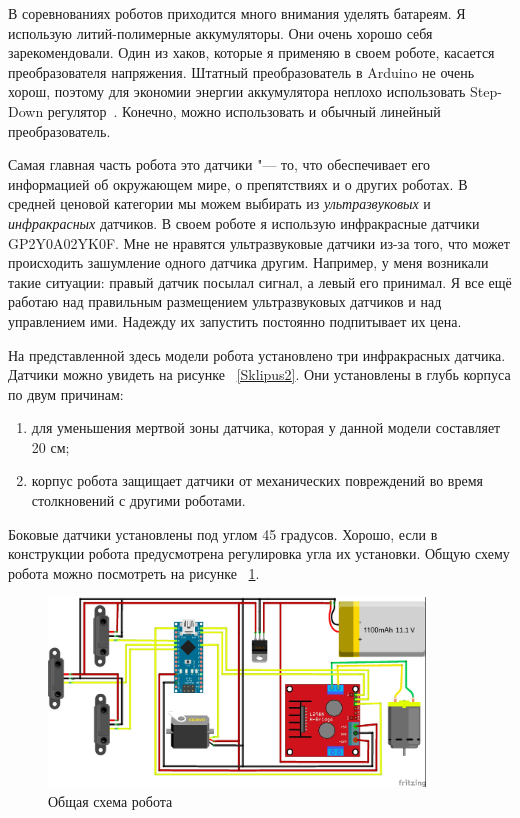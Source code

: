 \documentclass[10pt, a5paper]{article}
\begin{document}
В соревнованиях роботов приходится много внимания уделять батареям. Я использую литий-полимерные аккумуляторы. Они \linebreak очень хорошо себя зарекомендовали. Один из хаков, которые я применяю в своем роботе, касается преобразователя напряжения. Штатный преобразователь в Arduino не очень хорош, поэтому для экономии энергии аккумулятора неплохо использовать Step-Down регулятор~\cite{Sklipus2}. Конечно, можно использовать и обычный линейный преобразователь.

Самая главная часть робота это датчики "--- то, что обеспечивает его информацией об окружающем мире, о препятствиях и о других роботах. В средней ценовой категории мы можем выбирать из \emph{ультразвуковых} и \emph{инфракрасных} датчиков. В своем роботе я использую инфракрасные датчики GP2Y0A02YK0F. Мне не нравятся ультразвуковые датчики из-за того, что может происходить зашумление одного датчика другим. Например, у меня возникали такие ситуации: правый датчик посылал сигнал, а левый его принимал. Я все ещё работаю над правильным размещением ультразвуковых датчиков и над управлением ими. Надежду их запустить постоянно подпитывает их цена.

На представленной здесь модели робота установлено три инфракрасных датчика. Датчики можно увидеть на рисунке ~\ref{Sklipus2}. Они установлены в глубь корпуса по двум причинам:

\begin{enumerate}
  \item для уменьшения мертвой зоны датчика, которая у данной модели составляет 20 см;
  \item корпус робота защищает датчики от механических повреждений во время столкновений с другими роботами.
\end{enumerate}

Боковые датчики установлены под углом 45 градусов. Хорошо, если в конструкции робота предусмотрена регулировка угла их установки.
Общую схему робота можно посмотреть на рисунке ~\ref{Sklipus5}.

\begin{figure}[h!]
  \centering
  \includegraphics[width=10cm]{w_09_2016_Sklipus5.png}
  \caption {Общая схема робота}\label{Sklipus5}
\end{figure} 
\end{document}
